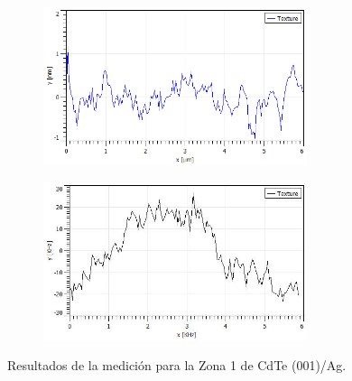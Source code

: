 \begin{figure}[H]
    \begin{subfigure}[b]{0.45\textwidth}
        \includegraphics[width = 0.85\textwidth]{figures/chap4/cdte-ag/afm-nsom-results/10um/CdTe_Ag_10um_profile.jpg}
    \end{subfigure}\hfill
    \begin{subfigure}[b]{0.45\textwidth}
        \includegraphics[width = 0.85\textwidth]{figures/chap4/cdte-ag/afm-nsom-results/10um/CdTe_Ag_10um_profile_nsom.jpg}
    \end{subfigure}
\caption{Resultados de la medición para la Zona 1 de CdTe (001)/Ag.}
\label{fig:afm-nsom-results-10um}
\end{figure}

